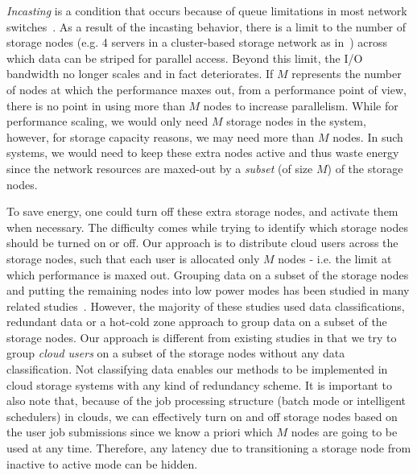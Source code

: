 \documentclass[preprint,12pt]{elsarticle}
\begin{document}
\textit{Incasting} is a condition that occurs because of queue limitations in most network
switches~\cite{Nagle:2004:PAS:1048933.1049998}. As a result of the incasting behavior, there
is a limit to the number of storage nodes (e.g. 4 servers in a cluster-based storage network
as in~\cite{Krevat:2007:AAA:1374596.1374598}) across which data can be
striped for parallel access. Beyond this limit,
the I/O bandwidth no longer scales and in fact deteriorates. If $M$ represents the number of nodes at
which the performance maxes out, from a performance point of view, there is no point in using more
than $M$ nodes to increase parallelism. While for performance scaling, we would only need $M$ storage nodes in the system,
however, for storage capacity reasons, we may need more than $M$ nodes. In such systems, we would
need to keep these extra nodes active and thus waste energy since the network resources are maxed-out
by a \textit{subset} (of size $M$) of the storage nodes.

To save energy, one could turn off these extra storage nodes, and activate them when necessary. The
difficulty comes while trying to identify which storage nodes should be turned on or off. Our approach
is to distribute cloud users across the storage nodes, such that each user is allocated only $M$
nodes - i.e. the limit at which performance is maxed out. Grouping data on a subset of the storage nodes
and putting the remaining nodes into low power modes has been studied in many related
studies~\cite{Kaushik:2010:GTE:1924920.1924927, Kaushik:2010:LSE:1851476.1851523, Leverich:2010:EEH:1740390.1740405}.
However, the majority of these studies used data classifications,
redundant data or a hot-cold zone approach
to group data on a subset of the storage nodes. Our approach is different from existing studies in that
we try to group \textit{cloud users} on a subset of the storage nodes without any data classification. Not
classifying data enables our methods to be implemented in cloud storage systems with any kind of
redundancy scheme. It is important to also note that, because of the job processing structure (batch mode or
intelligent schedulers) in clouds, we can effectively turn on and off storage nodes based on the user job
submissions since we know a priori which $M$ nodes are going to be used at any time. Therefore, any latency
due to transitioning a storage node from inactive to active mode can be hidden. 
\end{document}
